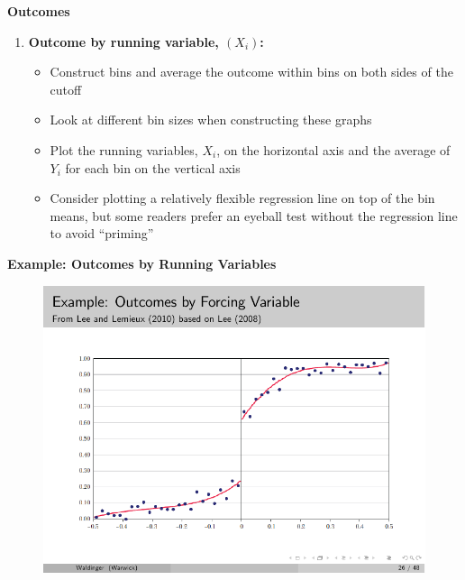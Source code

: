 \documentclass[notes=show]{beamer}
\begin{document}
\begin{frame}[plain]
	\begin{center}
	\textbf{Outcomes}
	\end{center}
	
	\begin{enumerate}
	\item \textbf{Outcome by running variable, $(X_i)$:}
		\begin{itemize}
		\item Construct bins and average the outcome within bins on both sides of the cutoff
		\item Look at different bin sizes when constructing these graphs 
		\item Plot the running variables, $X_i$, on the horizontal axis and the average of $Y_i$ for each bin on the vertical axis
		\item Consider plotting a relatively flexible regression line on top of the bin means, but some readers prefer an eyeball test without the regression line to avoid ``priming''
		\end{itemize}
	\end{enumerate}
\end{frame}

\begin{frame}[shrink=20,plain]
	\begin{center}
	\textbf{Example: Outcomes by Running Variables}
	\end{center}
	
	\begin{figure}
	\includegraphics[scale=1.05]{./lecture_includes/rdd_30.pdf}
	\end{figure}
	
\end{frame}
\end{document}
